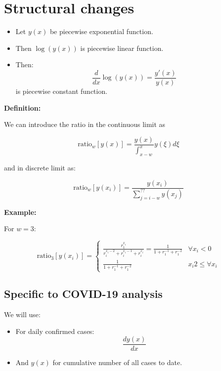 \chapter{Structural changes}


\begin{itemize}
    \item Let $y(x)$ be piecewise exponential function.
    \item Then $\log(y(x))$ is piecewise linear function.
    \item {Then:
        $$ \frac{d}{dx}\log(y(x)) = \frac{y'(x)}{y(x)}$$
        is piecewise constant function.
    }
\end{itemize}

\textbf{Definition:}

We can introduce the ratio in the continuous limit as

$$ \text{ratio}_w[y(x)] = \frac{y(x)}{\int_{x - w}^{x}}y(\xi)d\xi $$

and in discrete limit as:

$$ \text{ratio}_w[y(x_i)] = \frac{y(x_i)}{\sum_{j = i - w}^{??}y(x_j)} $$

\textbf{Example:}

For $w = 3$:

$$ \text{ratio}_3[y(x_i)] =
\begin{cases}
    \frac{r_1^{x_i}}{r_i^{x_i - 2} + r_i^{x_i - 1} + r_i^{x_i}} = \frac{1}{1 + r_1^{-1} + r_1^{-2}}  & \forall x_i < 0  \\
    \frac{1}{1 + r_1^{-1} + r_1^{-2}} &  x_i 2 \leq \forall x_i
\end{cases}
$$

\section{Specific to COVID-19 analysis}

We will use:

\begin{itemize}
    \item{ For daily confirmed cases:
        $$ \frac{dy(x)}{dx} $$
    }
    \item And $y(x)$ for cumulative number of all cases to date.
\end{itemize}